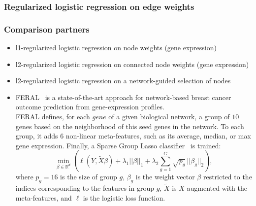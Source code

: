 \documentclass{bioinfo}
\newcommand{\xmat}{X}
\begin{document}
\begin{methods}
\subsubsection{Regularized logistic regression on edge weights}

\subsubsection{Comparison partners}
\begin{itemize}
\item l1-regularized logistic regression on node weights (gene expression)
\item l2-regularized logistic regression on connected node weights (gene expression)
\item l2-regularized logistic regression on a network-guided selection of nodes
\item FERAL~\cite{allahyar2015} is a state-of-the-art approach for network-based breast cancer outcome prediction from gene-expression profiles.\\
FERAL defines, for each $gene$ of a given biological network, a group of $10$ genes based on the neighborhood of this seed genes in the network. To each group, it adds $6$ non-linear meta-features, such as its average, median, or max gene expression. Finally, a Sparse Group Lasso classifier~\cite{friedman2010} is trained:
  \[
  \min_{\beta \in \mathbb{R}^d} \left( \ell(Y, \tilde \xmat  \beta) + \lambda_1 || \beta||_1 + 
  \lambda_2 \sum_{g=1}^G \sqrt{p_g}\, ||\beta_g||_2 \right),
  \]
  where $p_g = 16$ is the size of group $g$, 
  $\beta_g$ is the weight vector $\beta$ restricted to the indices 
  corresponding to the features in group $g$, 
  $\tilde \xmat$ is $\xmat$ augmented with the meta-features,
  and $\ell$ is the logistic loss function.

\end{itemize}




\enlargethispage{6pt}



\end{methods}
\end{document}
